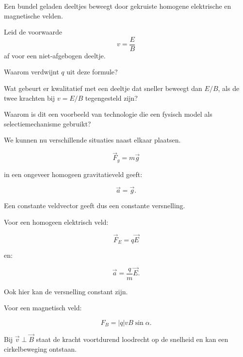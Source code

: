 \documentclass{ximera}
\begin{document}
\begin{oefening}[Snelheidsselector]{\oefG}

Een bundel geladen deeltjes beweegt door gekruiste homogene elektrische
en magnetische velden.

\begin{question}
Leid de voorwaarde
\[
v=\frac EB
\]
af voor een niet-afgebogen deeltje.
\end{question}

\begin{question}
Waarom verdwijnt $q$ uit deze formule?
\end{question}

\begin{question}
Wat gebeurt er kwalitatief met een deeltje dat sneller beweegt dan
$E/B$, als de twee krachten bij $v=E/B$ tegengesteld zijn?
\end{question}

\begin{question}
Waarom is dit een voorbeeld van technologie die een fysisch model als
selectiemechanisme gebruikt?
\end{question}

\end{oefening}




We kunnen nu verschillende situaties naast elkaar plaatsen.

\[
\boxed{
\vec F_g=m\vec g
}
\]

in een ongeveer homogeen gravitatieveld geeft:

\[
\vec a=\vec g.
\]

Een constante veldvector geeft dus een constante versnelling.

Voor een homogeen elektrisch veld:

\[
\boxed{
\vec F_E=q\vec E
}
\]

en:

\[
\boxed{
\vec a=\frac qm\vec E.
}
\]

Ook hier kan de versnelling constant zijn.

Voor een magnetisch veld:

\[
\boxed{
F_B=|q|vB\sin\alpha.
}
\]

Bij $\vec v\perp\vec B$ staat de kracht voortdurend loodrecht op de
snelheid en kan een cirkelbeweging ontstaan.
\end{document}
